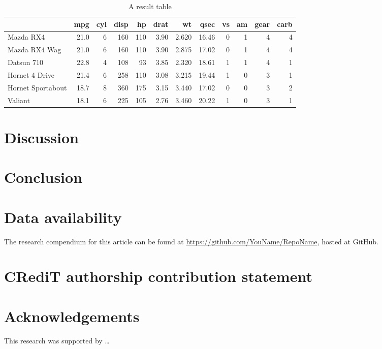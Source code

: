 \documentclass[]{elsarticle} %
\begin{document}
\begin{table}[htbp]

\caption{\label{tab:table}A result table}
\centering
\begin{tabular}[t]{lrrrrrrrrrrr}
\toprule
  & mpg & cyl & disp & hp & drat & wt & qsec & vs & am & gear & carb\\
\midrule
Mazda RX4 & 21.0 & 6 & 160 & 110 & 3.90 & 2.620 & 16.46 & 0 & 1 & 4 & 4\\
Mazda RX4 Wag & 21.0 & 6 & 160 & 110 & 3.90 & 2.875 & 17.02 & 0 & 1 & 4 & 4\\
Datsun 710 & 22.8 & 4 & 108 & 93 & 3.85 & 2.320 & 18.61 & 1 & 1 & 4 & 1\\
Hornet 4 Drive & 21.4 & 6 & 258 & 110 & 3.08 & 3.215 & 19.44 & 1 & 0 & 3 & 1\\
Hornet Sportabout & 18.7 & 8 & 360 & 175 & 3.15 & 3.440 & 17.02 & 0 & 0 & 3 & 2\\
Valiant & 18.1 & 6 & 225 & 105 & 2.76 & 3.460 & 20.22 & 1 & 0 & 3 & 1\\
\bottomrule
\end{tabular}
\end{table}

\hypertarget{discussion}{%
\section{Discussion}\label{discussion}}

\hypertarget{conclusion}{%
\section{Conclusion}\label{conclusion}}

\hypertarget{data-availability}{%
\section*{Data availability}\label{data-availability}}

The research compendium for this article can be found at
\url{https://github.com/YouName/RepoName}, hosted at GitHub.

\hypertarget{credit-authorship-contribution-statement}{%
\section*{CRediT authorship contribution statement}\label{credit-authorship-contribution-statement}}

\hypertarget{acknowledgements}{%
\section*{Acknowledgements}\label{acknowledgements}}

This research was supported by \ldots{}

\renewcommand\refname{References}

\end{document}
